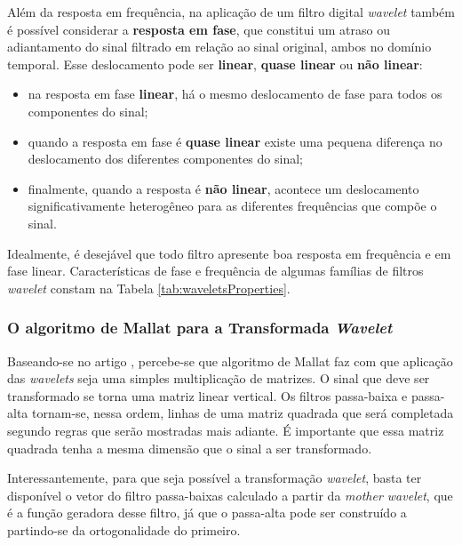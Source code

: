 			\par Além da resposta em frequência, na aplicação de um filtro digital \textit{wavelet} também é possível considerar a \textbf{resposta em fase}, que constitui um atraso ou adiantamento do sinal filtrado em relação ao sinal original, ambos no domínio temporal. Esse deslocamento pode ser \textbf{linear}, \textbf{quase linear} ou \textbf{não linear}: 
			
			\begin{itemize}
				\item na resposta em fase \textbf{linear}, há o mesmo deslocamento de fase para todos os componentes do sinal;
				\item quando a resposta em fase é \textbf{quase linear} existe uma pequena diferença no deslocamento dos diferentes componentes do sinal;
				\item finalmente, quando a resposta é \textbf{não linear}, acontece um deslocamento significativamente heterogêneo para as diferentes frequências que compõe o sinal.
				\end{itemize}
			
			\par Idealmente, é desejável que todo filtro apresente boa resposta em frequência e em fase linear. Características de fase e frequência de algumas famílias de filtros \textit{wavelet} constam na Tabela \ref{tab:waveletsProperties}.
			
			

		\subsubsection{O algoritmo de Mallat para a Transformada \textit{Wavelet}}
			\par Baseando-se no artigo \cite{7079589}, percebe-se que algoritmo de Mallat faz com que aplicação das \textit{wavelets} seja uma simples multiplicação de matrizes. O sinal que deve ser transformado se torna uma matriz linear vertical. Os filtros passa-baixa e passa-alta tornam-se, nessa ordem, linhas de uma matriz quadrada que será completada segundo regras que serão mostradas mais adiante. É importante que essa matriz quadrada tenha a mesma dimensão que o sinal a ser transformado.
		
			\par Interessantemente, para que seja possível a transformação \textit{wavelet}, basta ter disponível o vetor do filtro passa-baixas calculado a partir da \textit{mother wavelet}, que é a função geradora desse filtro, já que o passa-alta pode ser construído a partindo-se da ortogonalidade do primeiro.
			
